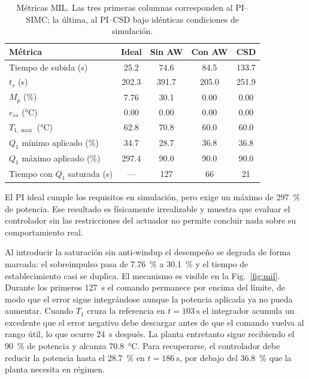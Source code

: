 \begin{table}[!t]
\caption{Métricas MIL. Las tres primeras columnas corresponden al PI--SIMC; la última, al PI--CSD
bajo idénticas condiciones de simulación.}
\label{tab:mil}
\centering
\footnotesize
\begin{tabular}{@{}lS[table-format=3.1]S[table-format=3.1]S[table-format=3.1]S[table-format=3.1]@{}}
\toprule
\textbf{Métrica} & {\textbf{Ideal}} & {\textbf{Sin AW}} & {\textbf{Con AW}} & {\textbf{CSD}} \\
\midrule
Tiempo de subida (\si{\second})        & 25.2  & 74.6  & 84.5  & 133.7 \\
$t_s$ (\si{\second})                   & 202.3 & 391.7 & 205.0 & 251.9 \\
$M_p$ (\si{\percent})                  & 7.76  & 30.1  & 0.00  & 0.00 \\
$e_{ss}$ (\si{\celsius})               & 0.00  & 0.00  & 0.00  & 0.00 \\
$T_{1,\max}$ (\si{\celsius})           & 62.8  & 70.8  & 60.0  & 60.0 \\
$Q_1$ mínimo aplicado (\si{\percent})  & 34.7  & 28.7  & 36.8  & 36.8 \\
$Q_1$ máximo aplicado (\si{\percent})  & 297.4 & 90.0  & 90.0  & 90.0  \\
Tiempo con $Q_1$ saturada (\si{\second}) & {---} & 127   & 66    & 21 \\
\bottomrule
\end{tabular}
\end{table}

El PI ideal cumple los requisitos en simulación, pero exige un máximo de \SI{297}{\percent} de
potencia. Ese resultado es físicamente irrealizable y muestra que evaluar el controlador sin las
restricciones del actuador no permite concluir nada sobre su comportamiento real.

Al introducir la saturación sin anti-windup el desempeño se degrada de forma marcada: el
sobreimpulso pasa de \SI{7.76}{\percent} a \SI{30.1}{\percent} y el tiempo de establecimiento casi
se duplica. El mecanismo es visible en la Fig.~\ref{fig:mil}. Durante los primeros
\SI{127}{\second} el comando permanece por encima del límite, de modo que el error sigue
integrándose aunque la potencia aplicada ya no pueda aumentar. Cuando $T_1$ cruza la referencia en
$t = \SI{103}{\second}$ el integrador acumula un excedente que el error negativo debe descargar
antes de que el comando vuelva al rango útil, lo que ocurre \SI{24}{\second} después. La planta
entretanto sigue recibiendo el \SI{90}{\percent} de potencia y alcanza \SI{70.8}{\celsius}. Para
recuperarse, el controlador debe reducir la potencia hasta el \SI{28.7}{\percent} en
$t = \SI{186}{\second}$, por debajo del \SI{36.8}{\percent} que la planta necesita en régimen.

